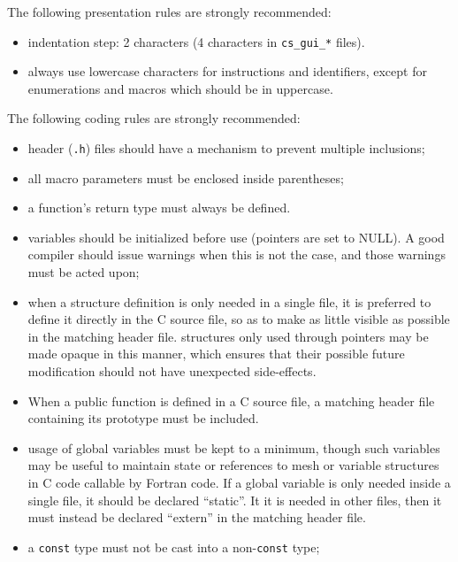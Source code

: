 The following presentation rules are strongly recommended:
\begin{itemize}
\item indentation step: 2 characters (4 characters in \texttt{cs\_gui\_*}
      files).
\item always use lowercase characters for instructions and identifiers,
      except for enumerations and macros which should be in uppercase.
\end{itemize}

The following coding rules are strongly recommended:

\begin{itemize}

\item header (\texttt{.h}) files should have a mechanism to prevent
  multiple inclusions;

\item all macro parameters must be enclosed inside parentheses;

\item a function's return type must always be defined.

\item variables should be initialized before use
  (pointers are set to NULL). A good compiler should issue warnings when
  this is not the case, and those warnings must be acted upon;

\item when a structure definition is only needed in a single file,
  it is preferred to define it directly in the C source file,
  so as to make as little visible as possible in the matching header file.
  structures only used through pointers may be made opaque in this
  manner, which ensures that their possible future modification should
  not have unexpected side-effects.

\item When a public function is defined in a C source file, a matching
  header file containing its prototype must be included.

\item usage of global variables must be kept to a minimum, though such
  variables may be useful to maintain state or references to mesh or
  variable structures in C code callable by Fortran code.
  If a global variable is only needed inside a single file, it should
  be declared ``static''. It it is needed in other files, then it must
  instead  be declared ``extern'' in the matching header file.

\item a \texttt{const} type must not be cast into a non-\texttt{const}
  type;


\end{itemize}
